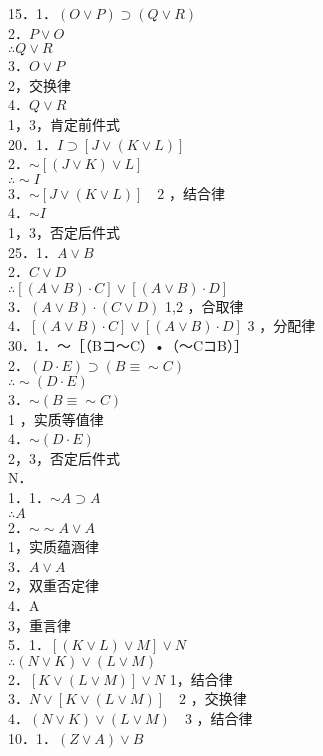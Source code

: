 15．1．$(O \vee P) \supset(Q \vee R)$\\
2．$P \vee O$\\
$\therefore Q \vee R$\\
3．$O \vee P$\\
2，交换律\\
4．$Q \vee R$\\
1，3，肯定前件式\\
20．1．$I \supset[J \vee(K \vee L)]$\\
2．$\sim[(J \vee K) \vee L]$\\
$\therefore \sim I$\\
3．$\sim[J \vee(K \vee L)] \quad 2$ ，结合律\\
4．$\sim I$\\
1，3，否定后件式\\
25．1．$A \vee B$\\
2．$C \vee D$\\
$\therefore[(A \vee B) \cdot C] \vee[(A \vee B) \cdot D]$\\
3．$(A \vee B) \cdot(C \vee D)$ 1,2 ，合取律\\
4．$[(A \vee B) \cdot C] \vee[(A \vee B) \cdot D]$ 3 ，分配律\\
30．1．～［（Bコ～C）•（～CコB）］\\
2．$(D \cdot E) \supset(B \equiv \sim C)$\\
$\therefore \sim(D \cdot E)$\\
3．$\sim(B \equiv \sim C)$\\
1 ，实质等值律\\
4．$\sim(D \cdot E)$\\
2，3，否定后件式\\
N．\\
1．1．$\sim A \supset A$\\
$\therefore A$\\
2．$\sim \sim A \vee A$\\
1，实质蕴涵律\\
3．$A \vee A$\\
2，双重否定律\\
4．A\\
3，重言律\\
5．1．$[(K \vee L) \vee M] \vee N$\\
$\therefore(N \vee K) \vee(L \vee M)$\\
2．$[K \vee(L \vee M)] \vee N$ 1，结合律\\
3．$N \vee[K \vee(L \vee M)] \quad 2$ ，交换律\\
4．$(N \vee K) \vee(L \vee M) \quad 3$ ，结合律\\
10．1．$(Z \vee A) \vee B$

